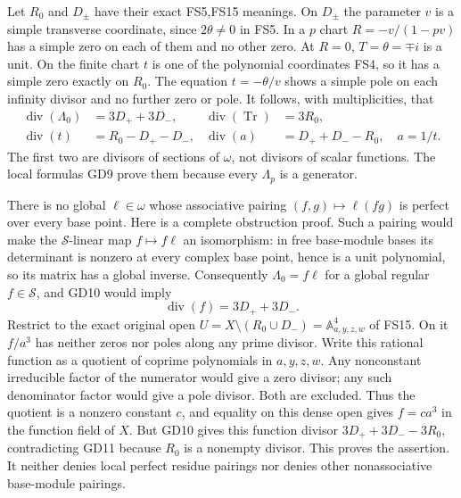 \documentclass[11pt]{article}
\begin{document}
Let $R_0$ and $D_\pm$ have their exact FS5,FS15 meanings.
On $D_\pm$ the parameter $v$ is a simple transverse
coordinate, since $2\theta\ne0$ in FS5. In a $p$ chart
$R=-v/(1-pv)$ has a simple zero on each of them and no
other zero. At $R=0$, $T=\theta=\mp i$ is a unit.
On the finite chart $t$ is one of the polynomial coordinates
FS4, so it has a simple zero exactly on $R_0$.
The equation $t=-\theta/v$ shows a simple pole on each
infinity divisor and no further zero or pole. It follows,
with multiplicities, that
\begin{equation}
\begin{aligned}
 \operatorname{div}(\Lambda_0)&=3D_++3D_-,&
 \operatorname{div}(\operatorname{Tr})&=3R_0,\\
 \operatorname{div}(t)&=R_0-D_+-D_-,&
 \operatorname{div}(a)&=D_++D_--R_0,\quad a=1/t.
\end{aligned}\tag{GD10}
\end{equation}
The first two are divisors of sections of $\omega$, not
divisors of scalar functions. The local formulas GD9
prove them because every $\Lambda_p$ is a generator.

There is no global $\ell\in\omega$ whose associative
pairing $(f,g)\mapsto\ell(fg)$ is perfect over every
base point. Here is a complete obstruction proof. Such
a pairing would make the $\mathscr S$-linear map
$f\mapsto f\ell$ an isomorphism: in free base-module
bases its determinant is nonzero at every complex base
point, hence is a unit polynomial, so its matrix has a
global inverse. Consequently $\Lambda_0=f\ell$ for a
global regular $f\in\mathscr S$, and GD10 would imply
\begin{equation}
 \operatorname{div}(f)=3D_++3D_-.
 \tag{GD11}
\end{equation}
Restrict to the exact original open
$U=X\setminus(R_0\cup D_-)=\mathbb A^4_{a,y,z,w}$
of FS15. On it $f/a^3$ has neither zeros nor poles
along any prime divisor. Write this rational function
as a quotient of coprime polynomials in $a,y,z,w$.
Any nonconstant irreducible factor of the numerator
would give a zero divisor; any such denominator factor
would give a pole divisor. Both are excluded. Thus the
quotient is a nonzero constant $c$, and equality on this
dense open gives $f=c a^3$ in the function field of $X$.
But GD10 gives this function divisor
$3D_++3D_--3R_0$, contradicting GD11 because $R_0$
is a nonempty divisor. This proves the assertion.
It neither denies local perfect residue pairings nor
denies other nonassociative base-module pairings.
\end{document}
